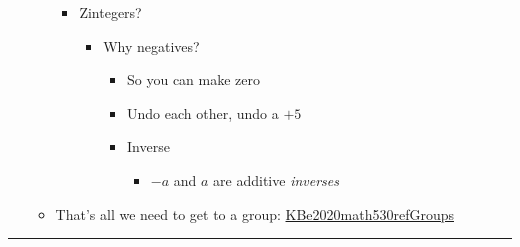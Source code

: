 \documentclass[letterpaper]{article}
\begin{document}
\begin{itemize}
\begin{itemize}
\begin{itemize}
\item Zintegers?

\begin{itemize}
\item Why negatives?

\begin{itemize}
\item So you can make zero
\item Undo each other, undo a \(+5\)
\item Inverse

\begin{itemize}
\item \(-a\) and \(a\) are additive \emph{inverses}
\end{itemize}
\end{itemize}
\end{itemize}
\end{itemize}

\item That's all we need to get to a group:
\href{KBe2020math530refGroups.org}{KBe2020math530refGroups}
\end{itemize}
\end{itemize}

\noindent\rule{\textwidth}{0.5pt}
\end{document}
